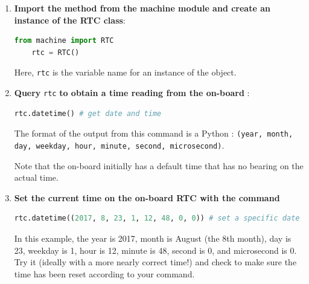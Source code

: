 \begin{enumerate}
	\item \textbf{Import the \rtc method from the machine module and create an instance of the RTC class}:
	\begin{lstlisting}[language=Python]
	from machine import RTC
	rtc = RTC() 
	\end{lstlisting}
	Here, \lstinline{rtc} is the variable name for an instance of the \rtc object.
	\item \textbf{Query} \lstinline{rtc} \textbf{to obtain a time reading from the on-board \rtc}:
	\begin{lstlisting}[language=Python]
	rtc.datetime() # get date and time
	\end{lstlisting}
	The format of the output from this command is a Python : \texttt{(year, month, day, weekday, hour, minute, second, microsecond)}.
	
	Note that the on-board \rtc initially has a default time that has no bearing on the actual time.
	  
	\item \textbf{Set the current time on the on-board RTC with the command}
	\begin{lstlisting}[language=Python]
	rtc.datetime((2017, 8, 23, 1, 12, 48, 0, 0)) # set a specific date and time
	\end{lstlisting}
	In this example, the year is 2017, month is August (the 8th month), day is 23, weekday is 1, hour is 12, minute is 48, second is 0, and microsecond is 0. Try it (ideally with a more nearly correct time!) and check to make sure the time has been reset according to your command.
\end{enumerate}

